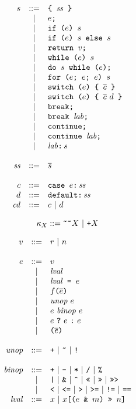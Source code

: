 \documentclass{article}
\newcommand{\ternary}[3]{{#1}\ \mathjs{?}\ {#2}\ \mathjs{:}\ {#3}}
\newcommand{\funcall}[2]{{#1}\mathjs{(}{#2}\mathjs{)}}
\newcommand{\paren}[1]{\mathjs{(}{#1}\mathjs{)}}
\newcommand{\seq}[1]{\overline{{#1}}}
\newcommand{\mathjs}[1]{\mbox{\texttt{{#1}}}}
\newcommand{\return}[1]{\mathjs{return }{#1}\mathjs{;}}
\newcommand{\while}[2]{\mathjs{while (}{#1}\mathjs{) }{#2}}
\newcommand{\dowhile}[2]{\mathjs{do }{#1}\mathjs{ while (}{#2}\mathjs{);}}
\newcommand{\for}[4]{\mathjs{for (}{#1}\mathjs{; }{#2}\mathjs{; }{#3}\mathjs{) }{#4}}
\newcommand{\switch}[2]{\mathjs{switch (}{#1}\mathjs{) \{ }{#2}\mathjs{ \}}}
\newcommand{\brk}{\mathjs{break;}}
\newcommand{\brkl}[1]{\mathjs{break }{#1}\mathjs{;}}
\newcommand{\cont}{\mathjs{continue;}}
\newcommand{\contl}[1]{\mathjs{continue }{#1}\mathjs{;}}
\newcommand{\lab}[2]{{#1}\mathjs{:}\,{#2}}
\newcommand{\ifthen}[2]{\mathjs{if (}{#1}\mathjs{) }{#2}}
\newcommand{\ifthenelse}[3]{\mathjs{if (}{#1}\mathjs{) }{#2}\mathjs{ else }{#3}}
\newcommand{\block}[1]{\mathjs{\{ }{#1}\mathjs{ \}}}
\newcommand{\getprop}[2]{{#1}\mathjs{[}{#2}\mathjs{]}}
\newcommand{\tobits}[1]{\mathjs{\~{}\~{}}{#1}}
\newcommand{\tofloat}[1]{\mathjs{+}{#1}}
\begin{document}
\[
\begin{array}{rcl}
s & ::= & \block{\mathit{ss}} \\
  &  |  & e\mathjs{;} \\
  &  |  & \ifthen{e}{s} \\
  &  |  & \ifthenelse{e}{s}{s} \\
  &  |  & \return{v} \\
  &  |  & \while{e}{s} \\
  &  |  & \dowhile{s}{e} \\
  &  |  & \for{e}{e}{e}{s} \\
  &  |  & \switch{e}{\seq{c}} \\
  &  |  & \switch{e}{\seq{c}\ d} \\
  &  |  & \brk \\
  &  |  & \brkl{\mathit{lab}} \\
  &  |  & \cont \\
  &  |  & \contl{\mathit{lab}} \\
  &  |  & \lab{\mathit{lab}}{s} \\
\\
\mathit{ss} & ::= & \seq{s} \\
\\
c & ::= & \mathjs{case }e\mathjs{:}\,\mathit{ss} \\
d & ::= & \mathjs{default:}\,\mathit{ss} \\
\mathit{cd} & ::= & c ~|~ d \\
\end{array}
\]

\[
\kappa_X ::= \tobits{X} ~|~ \tofloat{X}
\]

\[
\begin{array}{rcl}
v & ::= & r ~|~ n \\
\\
e & ::= & v \\
  &  |  & \mathit{lval} \\
  &  |  & \mathit{lval}\mathjs{ = }e \\
  &  |  & \funcall{f}{\seq{e}} \\
  &  |  & \mathit{unop}\ e \\
  &  |  & e\ \mathit{binop}\ e \\
  &  |  & \ternary{e}{e}{e} \\
  &  |  & \paren{\seq{e}} \\
\\
\mathit{unop} & ::= & \mathjs{+} ~|~ \mathjs{\~{}} ~|~ \mathjs{!} \\
\\
\mathit{binop} & ::= & \mathjs{+} ~|~ \mathjs{-} ~|~ \mathjs{*} ~|~ \mathjs{/} ~|~ \mathjs{\%} \\
               &  |  & \mathjs{|} ~|~ \mathjs{\&} ~|~ \mathjs{\^{}} ~|~ \mathjs{<<} ~|~ \mathjs{>>} ~|~ \mathjs{>>>} \\
               &  |  & \mathjs{<} ~|~ \mathjs{<=} ~|~ \mathjs{>} ~|~ \mathjs{>=} ~|~ \mathjs{!=} ~|~ \mathjs{==} \\
\mathit{lval} & ::= & x ~|~ \getprop{x}{\paren{e\mathjs{ \& }m}\mathjs{ >> }n} \\
\end{array}
\]
\end{document}
